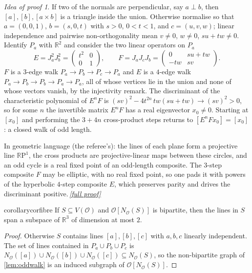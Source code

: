 \documentclass[11pt,a4paper]{article}
\theoremstyle{plain}
\theoremstyle{definition}
\theoremstyle{remark}
\newtheorem*{proofidea}{Idea of proof}
\newcommand{\fullproofref}[1]{\,\hyperref[#1]{\textit{[full proof]}}}
\newcommand{\cO}{\mathcal O}
\newcommand{\R}{\mathbb R}
\newcommand{\Nb}{N_{\cO}}
\newcommand{\Jm}[1]{J_{#1}}
\newcommand{\Pl}[1]{P_{#1}}
\begin{document}
\begin{proofidea}
If two of the normals are perpendicular, say $a\perp b$, then $[a],[b],[a\times b]$ is a triangle inside the union. Otherwise normalise so that $a=(0,0,1)$, $b=(s,0,t)$ with $s>0$, $0<t<1$, and $c=(u,v,w)$; linear independence and pairwise non-orthogonality mean $v\ne0$, $w\ne0$, $su+tw\ne0$. Identify $\Pl a$ with $\R^2$ and consider the two linear operators on $\Pl a$
\[
E=\Jm a^2\Jm b^2=\begin{pmatrix}t^2&0\\0&1\end{pmatrix},\qquad
F=\Jm a\Jm c\Jm b=\begin{pmatrix}0&su+tw\\-tw&sv\end{pmatrix}.
\]
$F$ is a $3$-edge walk $\Pl a\to\Pl b\to\Pl c\to\Pl a$ and $E$ is a $4$-edge walk $\Pl a\to\Pl b\to\Pl b\to\Pl a\to\Pl a$, all of whose vertices lie in the union and none of whose vectors vanish, by the injectivity remark. The discriminant of the characteristic polynomial of $E^nF$ is $(sv)^2-4t^{2n}\,tw(su+tw)\to(sv)^2>0$, so for some $n$ the invertible matrix $E^nF$ has a real eigenvector $x_0\ne0$. Starting at $[x_0]$ and performing the $3+4n$ cross-product steps returns to $[E^nFx_0]=[x_0]$: a closed walk of odd length.

In geometric language (the referee's): the lines of each plane form a projective line $\R\mathrm P^1$, the cross products are projective-linear maps between these circles, and an odd cycle is a real fixed point of an odd-length composite. The $3$-step composite $F$ may be elliptic, with no real fixed point, so one pads it with powers of the hyperbolic $4$-step composite $E$, which preserves parity and drives the discriminant positive.\fullproofref{pf:oddwalk}
\end{proofidea}

\begin{restatable}{corollary}{corfibre}\label{cor:fibre}
If $S\subseteq V(\cO)$ and $\cO[\Nb(S)]$ is bipartite, then the lines in $S$ span a subspace of $\R^3$ of dimension at most $2$.
\end{restatable}
\begin{proof}
Otherwise $S$ contains lines $[a],[b],[c]$ with $a,b,c$ linearly independent. The set of lines contained in $\Pl a\cup\Pl b\cup\Pl c$ is $\Nb([a])\cup\Nb([b])\cup\Nb([c])\subseteq\Nb(S)$, so the non-bipartite graph of \cref{lem:oddwalk} is an induced subgraph of $\cO[\Nb(S)]$.
\end{proof}
\end{document}
